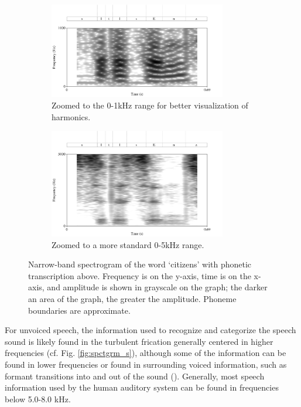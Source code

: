 \begin{figure}[H]
\begin{subfigure}{\textwidth}
  \centering
  \includegraphics[width=0.85\textwidth]{figure/spctgrm1k.png}
  \caption{Zoomed to the 0-1kHz range for better visualization of harmonics.}
  \label{fig:spctgrm_citizen_1k}
\end{subfigure}%
\hfill
\begin{subfigure}{0.95\textwidth}
  \centering
  \includegraphics[width=0.85\textwidth]{figure/spctgrm5k.png}
  \caption{Zoomed to a more standard 0-5kHz range.}
  \label{fig:spctgrm_citizen_5k}
\end{subfigure}
\caption{Narrow-band spectrogram of the word `citizens' with phonetic transcription above.  Frequency is on the y-axis, time is on the x-axis, and amplitude is shown in grayscale on the graph; the darker an area of the graph, the greater the amplitude. Phoneme boundaries are approximate.}
\label{fig:spctgrm_citizen}
\end{figure}

For unvoiced speech, the information used to recognize and categorize the speech sound is likely found in the turbulent frication generally centered in higher frequencies (cf. Fig. \ref{fig:spctgrm_s}), although some of the information can be found in lower frequencies or found in surrounding voiced information, such as formant transitions into and out of the sound (\cite{halle:57,lindblom:63,stevens:78,willi:17}).  Generally, most speech information used by the human auditory system can be found in frequencies below 5.0-8.0 kHz.

